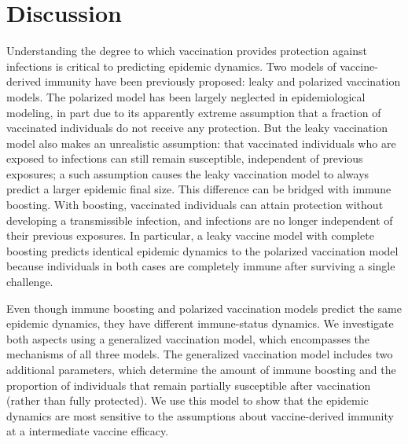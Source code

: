 \documentclass[12pt]{article}
\begin{document}
\section*{Discussion}

Understanding the degree to which vaccination provides protection against infections is critical to predicting epidemic dynamics.
Two models of vaccine-derived immunity have been previously proposed: leaky and polarized vaccination models.
The polarized model has been largely neglected in epidemiological modeling, in part due to its apparently extreme assumption that a fraction of vaccinated individuals do not receive any protection. 
But the leaky vaccination model also makes an unrealistic assumption: that vaccinated individuals who are exposed to infections can still remain susceptible, independent of previous exposures; 
a such assumption causes the leaky vaccination model to always predict a larger epidemic final size.
This difference can be bridged with immune boosting. With boosting, vaccinated individuals can attain protection without developing a transmissible infection, and infections are no longer independent of their previous exposures.
In particular, a leaky vaccine model with complete boosting predicts identical epidemic dynamics to the polarized vaccination model because individuals in both cases are completely immune after surviving a single challenge. 

Even though immune boosting and polarized vaccination models predict the same epidemic dynamics, they have different immune-status dynamics.
We investigate both aspects using a generalized vaccination model, which encompasses the mechanisms of all three models.
The generalized vaccination model includes two additional parameters, which determine the amount of immune boosting and the proportion of individuals that remain partially susceptible after vaccination (rather than fully protected).
We use this model to show that the epidemic dynamics are most sensitive to the assumptions about vaccine-derived immunity at a intermediate vaccine efficacy.
\end{document}
